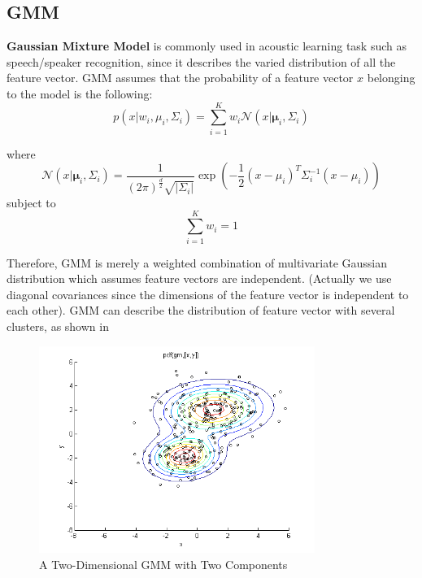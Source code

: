 
\subsection{GMM}
\textbf{Gaussian Mixture Model} is commonly used in acoustic learning task such as speech/speaker recognition,
since it describes the varied distribution of all the feature vector.\cite{GMM}
GMM assumes that the probability of a feature vector $x$ belonging to the model is the following:
\begin{equation}
p(x | w_i, \mu_i, \Sigma_i) = \sum_{i=1}^{K}{w_i \mathcal{N}(x | \mathbf{\mu}_i, \Sigma_i)}
\label{eqn:gmm}
\end{equation}

where
\[\mathcal{N}(x | \mathbf{\mu}_i, \Sigma_i) = \dfrac{1}{(2\pi)^{\frac{d}{2}}\sqrt{|\Sigma_i|}}
\exp \left({-\dfrac{1}{2}(x-\mu_i)^T\Sigma_i^{-1}(x-\mu_i)}\right)\]
subject to
\[\sum_{i=1}^{K} w_i = 1\]

  Therefore, GMM is merely a weighted combination of multivariate Gaussian distribution which
  assumes feature vectors are independent.
  (Actually we use diagonal covariances since the dimensions of the feature vector is independent to each other).
  GMM can describe the distribution of feature vector with several clusters, as shown in 
\begin{figure}[H]
  \centering
  \includegraphics[width=0.8\textwidth]{img/gmm.png}
  \caption{A Two-Dimensional GMM with Two Components\label{fig:gmm-fig}}
\end{figure}

